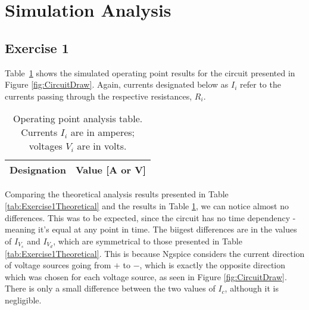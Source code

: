 \section{Simulation Analysis}
\label{sec:simulation}

\subsection{Exercise 1}

Table~\ref{tab:Exercise1Simulation} shows the simulated operating point results for the circuit presented in Figure \ref{fig:CircuitDraw}. Again, currents designated below as $I_i$ refer to the currents passing through the respective resistances, $R_i$.

\begin{table}[H]
  \centering
  \begin{tabular}{|c|c|}
    \hline    
    {\bf Designation} & {\bf Value [A or V]} \\ \hline
    
  \end{tabular}
  \caption{Operating point analysis table. Currents $I_i$ are in amperes; voltages $V_i$ are in volts.}
  \label{tab:Exercise1Simulation}
\end{table}

Comparing the theoretical analysis results presented in Table \ref{tab:Exercise1Theoretical} and the results in Table \ref{tab:Exercise1Simulation}, we can notice almost no differences. This was to be expected, since the circuit has no time dependency - meaning it's equal at any point in time. The biigest differences are in the values of $I_{V_s}$ and $I_{V_d}$, which are symmetrical to those presented in Table \ref{tab:Exercise1Theoretical}. This is because Ngspice considers the current direction of voltage sources going from $+$ to $-$, which is exactly the opposite direction which was chosen for each voltage source, as seen in Figure \ref{fig:CircuitDraw}. There is only a small difference between the two values of $I_c$, although it is negligible.
